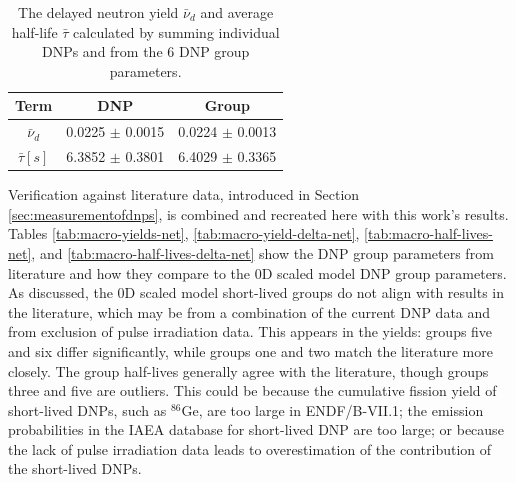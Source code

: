 \begin{table}[!ht]
    \centering
    \caption{The delayed neutron yield $\bar{\nu}_{d}$ and average half-life $\bar{\tau}$ calculated by summing individual \glspl{DNP} and from the 6 \gls{DNP} group parameters.}
    \begin{tabular}{ccc}
    \hline
       Term & \gls{DNP} & Group \\
       \hline
        $\bar{\nu}_d$ & 0.0225 $\pm$ 0.0015 & 0.0224 $\pm$ 0.0013\\
        $\bar{\tau} [s]$ & 6.3852 $\pm$ 0.3801 & 6.4029 $\pm$ 0.3365\\
        \hline
    \end{tabular}
    \label{tab:indiv-dnp-params}
\end{table}


Verification against literature data, introduced in Section \ref{sec:measurementofdnps}, is combined and recreated here with this work’s results.
Tables \ref{tab:macro-yields-net}, \ref{tab:macro-yield-delta-net}, \ref{tab:macro-half-lives-net}, and \ref{tab:macro-half-lives-delta-net} show the \gls{DNP} group parameters from literature and how they compare to the 0D scaled model \gls{DNP} group parameters.
As discussed, the 0D scaled model short-lived groups do not align with results in the literature, which may be from a combination of the current \gls{DNP} data and from exclusion of pulse irradiation data.
This appears in the yields: groups five and six differ significantly, while groups one and two match the literature more closely.
The group half-lives generally agree with the literature, though groups three and five are outliers.
This could be because the cumulative fission yield of short-lived \glspl{DNP}, such as $^{86}$Ge, are too large in ENDF/B-VII.1; the emission probabilities in the \gls{IAEA} database for short-lived \gls{DNP} are too large; or because the lack of pulse irradiation data leads to overestimation of the contribution of the short-lived \glspl{DNP}.


